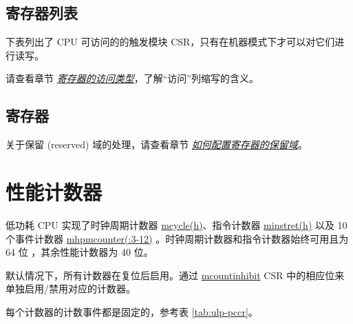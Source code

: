 \documentclass[main\_\_CN.tex]{subfiles}
\begin{document}
\subsection{寄存器列表}
下表列出了 CPU 可访问的的触发模块 CSR，只有在机器模式下才可以对它们进行读写。

请查看章节 \hyperref[glossary-access-types]{\textit{寄存器的访问类型}}，了解“访问”列缩写的含义。



\subsection{寄存器}

关于保留 (reserved) 域的处理，请查看章节 \hyperref[programming-reserved-field]{\textit{如何配置寄存器的保留域}}。




\section{性能计数器}

低功耗 CPU 实现了时钟周期计数器 \hyperref[regdesc:LPMCYCLEH]{mcycle(h)}、指令计数器 \hyperref[regdesc:LPMINSTRETH]{minstret(h)} 以及 10 个事件计数器 \hyperref[regdesc:LPMHPMCOUNTER]{mhpmcounter(:3-12)} 。时钟周期计数器和指令计数器始终可用且为 64 位 ，其余性能计数器为 40 位。

默认情况下，所有计数器在复位后启用。通过 \hyperref[regdesc:LPMCOUNTINHIBIT]{mcountinhibit} CSR 中的相应位来单独启用/禁用对应的计数器。

每个计数器的计数事件都是固定的，参考表 \ref{tab:ulp-pccr}。
\end{document}
